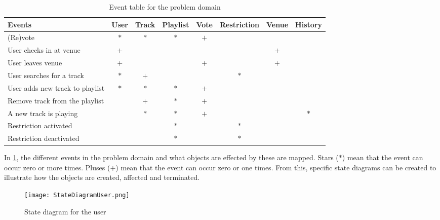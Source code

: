 \begin{table}[htbp]
    \centering
    \tabcolsep=0.10cm
    \begin{tabular}{lccccccc}
        \toprule
        \textbf{Events}                 & User   & Track  & Playlist & Vote   & Restriction & Venue  & History\\
        \midrule
        (Re)vote                        & $\ast$ & $\ast$ &   $\ast$ &   $+$  &             &        &        \\
        User checks in at venue         & $+$    &        &          &        &             & $+$    &        \\
        User leaves venue               & $+$    &        &          &  $+$   &             & $+$    &        \\
        User searches for a track       & $\ast$ &  $+$   &          &        & $\ast$      &        &        \\
        User adds new track to playlist & $\ast$ & $\ast$ & $\ast$   & $+$    &             &        &        \\
        Remove track from the playlist  &        & $+$    & $\ast$   & $+$    &             &        &        \\
        A new track is playing          &        & $\ast$ & $\ast$   & $+$    &             &        & $\ast$ \\
        Restriction activated           &        &        & $\ast$   &        & $\ast$      &        &        \\
        Restriction deactivated         &        &        & $\ast$   &        & $\ast$      &        &        \\
        \bottomrule
    \end{tabular}
    \caption{Event table for the problem domain}\label{eventtable}
\end{table}

In \cref{eventtable}, the different events in the problem domain and
what objects are effected by these are mapped. Stars ($\ast$) mean that the
event can occur zero or more times. Pluses ($+$) mean that the event can
occur zero or one times. From this, specific state diagrams can be created to illustrate how the objects are created, affected and terminated.

\begin{figure}[H]
  \centering
  \texttt{[image: StateDiagramUser.png]}
  \caption{State diagram for the user}\label{fig:StateDiagramUser}
\end{figure}

